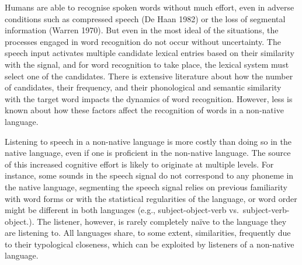 \documentclass[
  man]{apa6}
\begin{document}
Humans are able to recognise spoken words without much effort, even in
adverse conditions such as compressed speech (De Haan 1982) or the loss
of segmental information (Warren 1970). But even in the most ideal of
the situations, the processes engaged in word recognition do not occur
without uncertainty. The speech input activates multiple candidate
lexical entries based on their similarity with the signal, and for word
recognition to take place, the lexical system must select one of the
candidates. There is extensive literature about how the number of
candidates, their frequency, and their phonological and semantic
similarity with the target word impacts the dynamics of word
recognition. However, less is known about how these factors affect the
recognition of words in a non-native language.

Listening to speech in a non-native language is more costly than doing
so in the native language, even if one is proficient in the non-native
language. The source of this increased cognitive effort is likely to
originate at multiple levels. For instance, some sounds in the speech
signal do not correspond to any phoneme in the native language,
segmenting the speech signal relies on previous familiarity with word
forms or with the statistical regularities of the language, or word
order might be different in both languages (e.g., subject-object-verb
vs.~subject-verb-object.). The listener, however, is rarely completely
naïve to the language they are listening to. All languages share, to
some extent, similarities, frequently due to their typological
closeness, which can be exploited by listeners of a non-native language.
\end{document}
